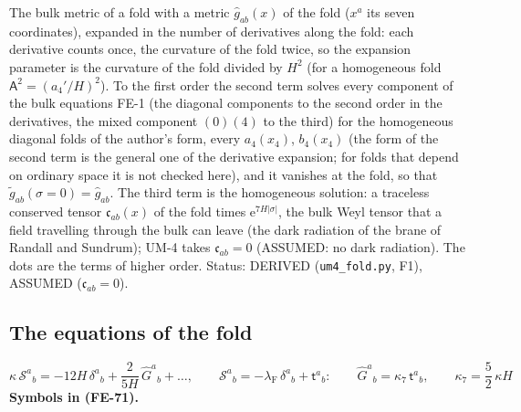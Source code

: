 \documentclass[
  10pt,
]{article}
\begin{document}
The bulk metric of a fold with a metric \(\hat g_{ab}(x)\) of the fold
(\(x^a\) its seven coordinates), expanded in the number of derivatives
along the fold: each derivative counts once, the curvature of the fold
twice, so the expansion parameter is the curvature of the fold divided
by \(H^2\) (for a homogeneous fold \(\mathsf{A}^2 = (a_4'/H)^2\)). To
the first order the second term solves every component of the bulk
equations FE-1 (the diagonal components to the second order in the
derivatives, the mixed component \((0)(4)\) to the third) for the
homogeneous diagonal folds of the author's form, every \(a_4(x_4)\),
\(b_4(x_4)\) (the form of the second term is the general one of the
derivative expansion; for folds that depend on ordinary space it is not
checked here), and it vanishes at the fold, so that
\(\tilde g_{ab}(\sigma = 0) = \hat g_{ab}\). The third term is the
homogeneous solution: a traceless conserved tensor
\(\mathfrak{c}_{ab}(x)\) of the fold times
\(\mathrm{e}^{7H\lvert\sigma\rvert}\), the bulk Weyl tensor that a field
travelling through the bulk can leave (the dark radiation of the brane
of Randall and Sundrum); UM-4 takes \(\mathfrak{c}_{ab} = 0\) (ASSUMED:
no dark radiation). The dots are the terms of higher order. Status:
DERIVED (\texttt{um4\_fold.py}, F1), ASSUMED
(\(\mathfrak{c}_{ab} = 0\)).

\hypertarget{the-equations-of-the-fold}{%
\subsection{The equations of the fold}\label{the-equations-of-the-fold}}

\[
\kappa\,\mathcal{S}^a{}_b = -12H\,\delta^a{}_b + \frac{2}{5H}\,\hat G^a{}_b + \dots,\qquad
\mathcal{S}^a{}_b = -\lambda_{\mathrm{F}}\,\delta^a{}_b + \mathsf{t}^a{}_b:\qquad
\hat G^a{}_b = \kappa_7\,\mathsf{t}^a{}_b,\qquad \kappa_7 = \frac52\,\kappa H \tag{FE-71}
\] \textbf{Symbols in (FE-71).}
\end{document}

